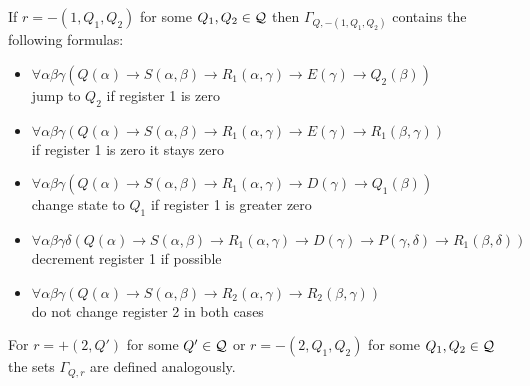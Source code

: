 If $r=-(1,Q_1,Q_2)$ for some $Q_1,Q_2\in\mathcal{Q}$ then $\Gamma_{Q,-(1,Q_1,Q_2)}$ contains the following formulas:
\begin{itemize}
	\item $\forall\alpha\beta\gamma(Q(\alpha)\to S(\alpha,\beta)\to R_1(\alpha,\gamma)\to E(\gamma)\to Q_2(\beta))$\\jump to $Q_2$ if register 1 is zero
	\item $\forall\alpha\beta\gamma(Q(\alpha)\to S(\alpha,\beta)\to R_1(\alpha,\gamma)\to E(\gamma)\to R_1(\beta,\gamma))$\\if register 1 is zero it stays zero
	\item $\forall\alpha\beta\gamma(Q(\alpha)\to S(\alpha,\beta)\to R_1(\alpha,\gamma)\to D(\gamma)\to Q_1(\beta))$\\change state to $Q_1$ if register 1 is greater zero
	\item $\forall\alpha\beta\gamma\delta(Q(\alpha)\to S(\alpha,\beta)\to R_1(\alpha,\gamma)\to D(\gamma) \to P(\gamma,\delta)\to R_1(\beta,\delta))$\\decrement register 1 if possible
	\item $\forall\alpha\beta\gamma(Q(\alpha)\to S(\alpha,\beta)\to R_2(\alpha,\gamma)\to R_2(\beta,\gamma))$\\do not change register 2 in both cases
\end{itemize}

For $r=+(2,Q')$ for some $Q'\in\mathcal{Q}$ or $r=-(2,Q_1,Q_2)$ for some $Q_1,Q_2\in\mathcal{Q}$ the sets $\Gamma_{Q,r}$ are defined analogously.

